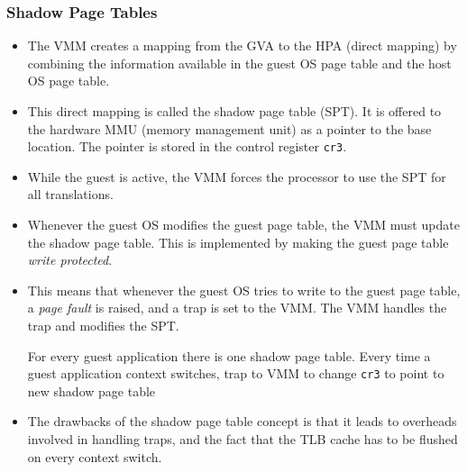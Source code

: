\documentclass{article}
\begin{document}
\subsubsection{Shadow Page Tables}
\begin{itemize}
    \item The VMM creates a mapping from the GVA to the HPA (direct mapping) by combining the information available in the guest OS page table and the host OS page table. 
    
    \item This direct mapping is called the shadow page table (SPT). It is offered to the hardware MMU (memory management unit) as a pointer to the base location. The pointer is stored in the control register \texttt{cr3}. 
    
    \item While the guest is active, the VMM forces the processor to use the SPT for all translations.
    
    \item Whenever the guest OS modifies the guest page table, the VMM must update the shadow page table. This is implemented by making the guest page table \textit{write protected}. 
    
    \item This means that whenever the guest OS tries to write to the guest page table, a \textit{page fault} is raised, and a trap is set to the VMM. The VMM handles the trap and modifies the SPT. 
    
    \iitem For every guest application there is one shadow page table. Every time a guest application context switches, trap to VMM to change \texttt{cr3} to point to new shadow page table
    
    \item The drawbacks of the shadow page table concept is that it leads to overheads involved in handling traps, and the fact that the TLB cache has to be flushed on every context switch. 
\end{itemize}
\end{document}
